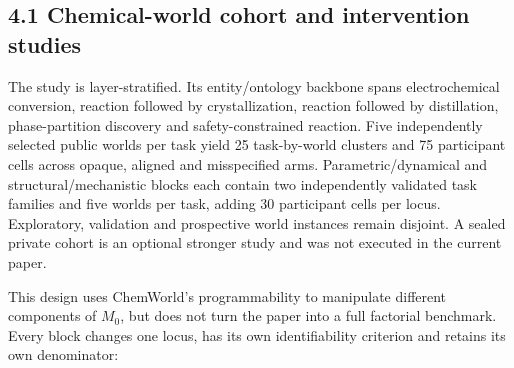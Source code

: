 \documentclass[10pt,twocolumn]{article}
\begin{document}
\subsection{4.1 Chemical-world cohort and intervention
studies}\label{chemical-world-cohort-and-intervention-studies}

The study is layer-stratified. Its entity/ontology backbone spans
electrochemical conversion, reaction followed by crystallization,
reaction followed by distillation, phase-partition discovery and
safety-constrained reaction. Five independently selected public worlds
per task yield 25 task-by-world clusters and 75 participant cells across
opaque, aligned and misspecified arms. Parametric/dynamical and
structural/mechanistic blocks each contain two independently validated
task families and five worlds per task, adding 30 participant cells per
locus. Exploratory, validation and prospective world instances remain
disjoint. A sealed private cohort is an optional stronger study and was
not executed in the current paper.

This design uses ChemWorld's programmability to manipulate different
components of \(M_0\), but does not turn the paper into a full factorial
benchmark. Every block changes one locus, has its own identifiability
criterion and retains its own denominator:
\end{document}
